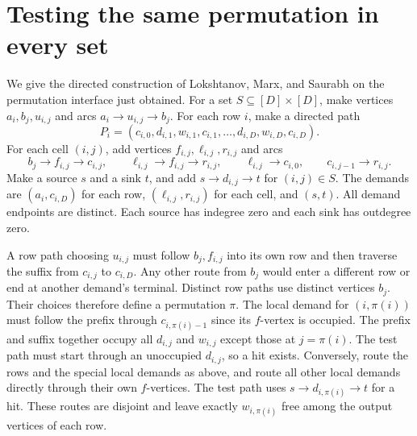 \documentclass[11pt]{article}
\begin{document}
\section{Testing the same permutation in every set}

We give the directed construction of Lokshtanov, Marx, and Saurabh
\cite[Section 5]{lms} on the permutation interface just obtained. For a
set \(S\subseteq [D]\times[D]\), make vertices \(a_i,b_j,u_{i,j}\) and
arcs \(a_i\to u_{i,j}\to b_j\). For each row \(i\), make a directed path
\[
 P_i=(c_{i,0},d_{i,1},w_{i,1},c_{i,1},\dots,d_{i,D},w_{i,D},c_{i,D}).
\]
For each cell \((i,j)\), add vertices \(f_{i,j},\ell_{i,j},r_{i,j}\)
and arcs
\[
 b_j\to f_{i,j}\to c_{i,j},\qquad
 \ell_{i,j}\to f_{i,j}\to r_{i,j},\qquad
 \ell_{i,j}\to c_{i,0},\qquad c_{i,j-1}\to r_{i,j}.
\]
Make a source \(s\) and a sink \(t\), and add \(s\to d_{i,j}\to t\)
for \((i,j)\in S\). The demands are \((a_i,c_{i,D})\) for each row,
\((\ell_{i,j},r_{i,j})\) for each cell, and \((s,t)\). All demand endpoints
are distinct. Each source has indegree zero and each sink has outdegree zero.

A row path choosing \(u_{i,j}\) must follow \(b_j,f_{i,j}\) into its own
row and then traverse the suffix from \(c_{i,j}\) to \(c_{i,D}\). Any other
route from \(b_j\) would enter a different row or end at another demand's
terminal. Distinct row paths use distinct vertices \(b_j\). Their choices
therefore define a permutation \(\pi\).
The local demand for \((i,\pi(i))\) must follow the prefix through
\(c_{i,\pi(i)-1}\) since its \(f\)-vertex is occupied. The prefix and suffix
together occupy all \(d_{i,j}\) and \(w_{i,j}\) except those at
\(j=\pi(i)\). The test path must start through an unoccupied \(d_{i,j}\),
so a hit exists. Conversely, route the rows and the special local demands
as above, and route all other local demands directly through their own
\(f\)-vertices. The test path uses \(s\to d_{i,\pi(i)}\to t\) for a hit.
These routes are disjoint and leave exactly \(w_{i,\pi(i)}\) free among
the output vertices of each row.
\end{document}
